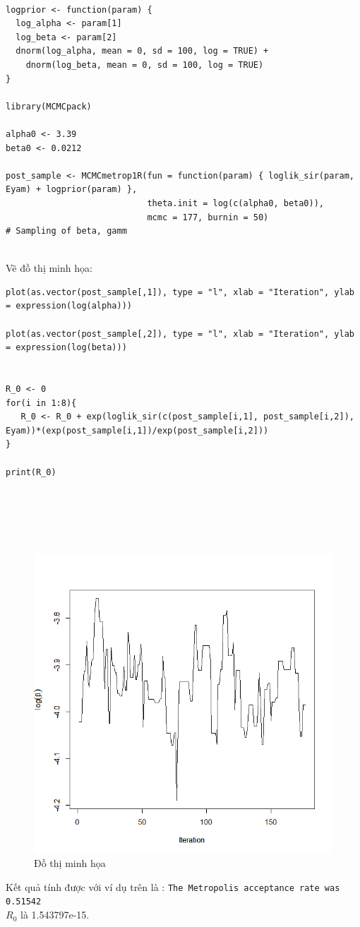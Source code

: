 \documentclass[a4paper]{article}
\begin{document}
\\
\begin{lstlisting}
logprior <- function(param) { 
  log_alpha <- param[1]
  log_beta <- param[2]
  dnorm(log_alpha, mean = 0, sd = 100, log = TRUE) +
    dnorm(log_beta, mean = 0, sd = 100, log = TRUE)
}

library(MCMCpack)

alpha0 <- 3.39
beta0 <- 0.0212

post_sample <- MCMCmetrop1R(fun = function(param) { loglik_sir(param, Eyam) + logprior(param) },
                            theta.init = log(c(alpha0, beta0)),
                            mcmc = 177, burnin = 50)
# Sampling of beta, gamm

\end{lstlisting}
\\
Vẽ đồ thị minh họa:
\\
\begin{lstlisting}
plot(as.vector(post_sample[,1]), type = "l", xlab = "Iteration", ylab = expression(log(alpha)))

plot(as.vector(post_sample[,2]), type = "l", xlab = "Iteration", ylab = expression(log(beta)))


R_0 <- 0 
for(i in 1:8){
   R_0 <- R_0 + exp(loglik_sir(c(post_sample[i,1], post_sample[i,2]), Eyam))*(exp(post_sample[i,1])/exp(post_sample[i,2]))
}

print(R_0)




\end{lstlisting}

\\
\begin{center}
    \begin{figure}[htp]
    \begin{center}
     \includegraphics[scale=.5]{Images/Sir1.png}
    \end{center}
    \caption{Đồ thị minh họa}
    \label{refhinh1}
    \end{figure}
\end{center}

Kết quả tính được với ví dụ trên là :
\lstinline{The Metropolis acceptance rate was 0.51542}\\
$R_{0}$ là 1.543797e-15.
\end{document}
